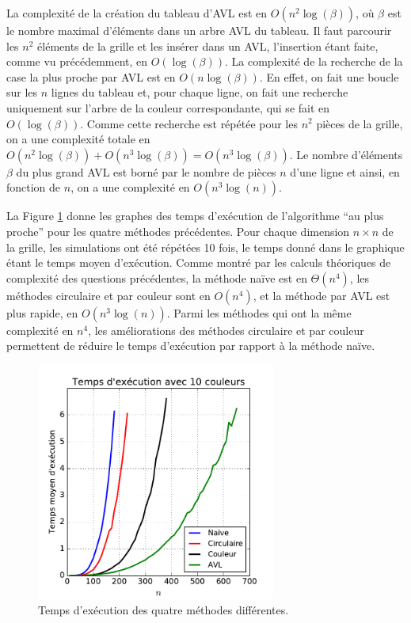 \documentclass[a4paper,12pt]{article}
\numberwithin{equation}{section}
\begin{document}
La complexité de la création du tableau d'AVL est en $O(n^2 \log(\beta))$, où $\beta$ est le nom\-bre maximal d'éléments dans un arbre AVL du tableau. Il faut parcourir les $n^2$ éléments de la grille et les insérer dans un AVL, l'insertion étant faite, comme vu précédemment, en $O(\log(\beta))$. La complexité de la recherche de la case la plus proche par AVL est en $O(n \log(\beta))$. En effet, on fait une boucle sur les $n$ lignes du tableau \verb@M@ et, pour chaque ligne, on fait une recherche uniquement sur l'arbre de la couleur correspondante, qui se fait en $O(\log(\beta))$. Comme cette recherche est répétée pour les $n^2$ pièces de la grille, on a une complexité totale en $O(n^2 \log(\beta)) + O(n^3 \log(\beta)) = O(n^3 \log(\beta))$. Le nombre d'éléments $\beta$ du plus grand AVL est borné par le nombre de pièces $n$ d'une ligne et ainsi, en fonction de $n$, on a une complexité en $O(n^3 \log(n))$.

La Figure \ref{FigGraphes} donne les graphes des temps d'exécution de l'algorithme ``au plus proche'' pour les quatre méthodes précédentes. Pour chaque dimension $n \times n$ de la grille, les simulations ont été répétées 10 fois, le temps donné dans le graphique étant le temps moyen d'exécution. Comme montré par les calculs théoriques de complexité des questions précédentes, la méthode naïve est en $\Theta(n^4)$, les méthodes circulaire et par couleur sont en $O(n^4)$, et la méthode par AVL est plus rapide, en $O(n^3 \log(n))$. Parmi les méthodes qui ont la même complexité en $n^4$, les améliorations des méthodes circulaire et par couleur permettent de réduire le temps d'exécution par rapport à la méthode naïve.

\begin{figure}[ht]
\centering
\includegraphics[width=0.7\textwidth]{Temps.pdf}
\caption{Temps d'exécution des quatre méthodes différentes.}
\label{FigGraphes}
\end{figure}
\end{document}
